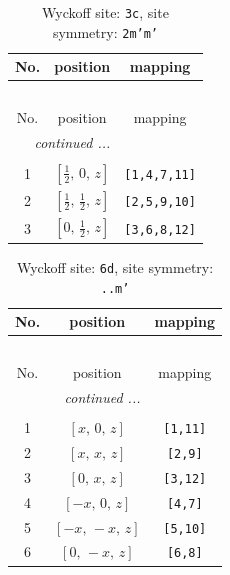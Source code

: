 \documentclass[fleqn,8pt]{jsarticle}
\begin{document}
\begin{longtable}{ccc}
\caption{Wyckoff site: {\tt 3c}, site symmetry: {\tt 2m'm'}}
 \\
 \hline \hline
No. & position & mapping \\ \hline \endfirsthead

\multicolumn{2}{l}{\tablename\ \thetable{}} \\
 \hline \hline
No. & position & mapping \\ \hline \endhead

 \hline \hline
\multicolumn{2}{r}{\footnotesize\it continued ...} \\ \endfoot

 \hline \hline
\multicolumn{2}{r}{} \\ \endlastfoot

1 & $\left[ \frac{1}{2},\, 0,\, z \right]$ & {\tt [1,4,7,11]} \\ \hline
2 & $\left[ \frac{1}{2},\, \frac{1}{2},\, z \right]$ & {\tt [2,5,9,10]} \\ \hline
3 & $\left[ 0,\, \frac{1}{2},\, z \right]$ & {\tt [3,6,8,12]} \\
\end{longtable}
\renewcommand{\arraystretch}{1.2}
\begin{longtable}{ccc}
\caption{Wyckoff site: {\tt 6d}, site symmetry: {\tt ..m'}}
 \\
 \hline \hline
No. & position & mapping \\ \hline \endfirsthead

\multicolumn{2}{l}{\tablename\ \thetable{}} \\
 \hline \hline
No. & position & mapping \\ \hline \endhead

 \hline \hline
\multicolumn{2}{r}{\footnotesize\it continued ...} \\ \endfoot

 \hline \hline
\multicolumn{2}{r}{} \\ \endlastfoot

1 & $\left[ x,\, 0,\, z \right]$ & {\tt [1,11]} \\ \hline
2 & $\left[ x,\, x,\, z \right]$ & {\tt [2,9]} \\ \hline
3 & $\left[ 0,\, x,\, z \right]$ & {\tt [3,12]} \\ \hline
4 & $\left[ - x,\, 0,\, z \right]$ & {\tt [4,7]} \\ \hline
5 & $\left[ - x,\, - x,\, z \right]$ & {\tt [5,10]} \\ \hline
6 & $\left[ 0,\, - x,\, z \right]$ & {\tt [6,8]} \\
\end{longtable}
\end{document}
